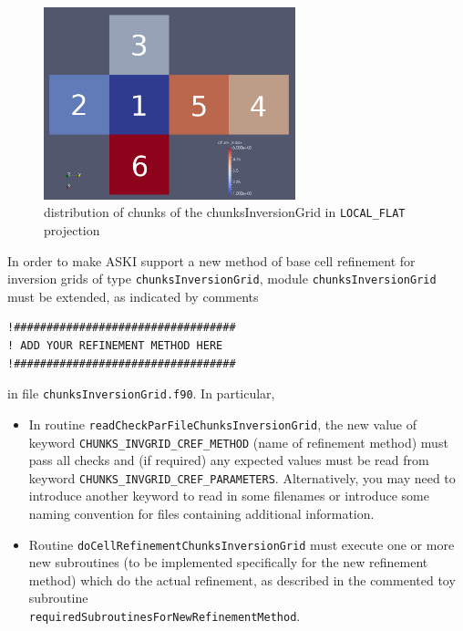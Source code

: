 \documentclass[12pt,a4paper]{article}
\newcommand{\lcode}[1]{\nolinkurl{#1}}
\newcommand{\ASKI}{ {\ttfamily ASKI} }
\begin{document}
\begin{figure}[ht]
  \centering
  \includegraphics[width=0.65\textwidth]{images/chunksInversionGrid_6-chunks_ichunk_LOCAL_FLAT_numbers.png}
  \caption{distribution of chunks of the chunksInversionGrid in \lcode{LOCAL_FLAT} projection}
  \label{ssec-invgrid:chunks-cell-ref,fig:ichunk}
\end{figure}

In order to make \ASKI{} support a new method of base cell refinement for inversion grids of type 
\lcode{chunksInversionGrid}, module \lcode{chunksInversionGrid} must be extended, as indicated by comments
\begin{verbatim}
!##################################
! ADD YOUR REFINEMENT METHOD HERE
!##################################
\end{verbatim}
in file \lcode{chunksInversionGrid.f90}. In particular,
\begin{itemize}
\item In routine \lcode{readCheckParFileChunksInversionGrid}, the new value of keyword 
  \lcode{CHUNKS_INVGRID_CREF_METHOD} (name of refinement method) must pass all checks and (if required) any 
  expected values must be read from keyword \lcode{CHUNKS_INVGRID_CREF_PARAMETERS}.
  Alternatively, you may need to introduce another keyword to read in some filenames
  or introduce some naming convention for files containing additional information.
\item Routine \lcode{doCellRefinementChunksInversionGrid} must execute one or more new subroutines (to be 
  implemented specifically for the new refinement method) which do the actual refinement, as described in
  the commented toy subroutine \\\lcode{requiredSubroutinesForNewRefinementMethod}.
\end{itemize}
 

\end{document}
